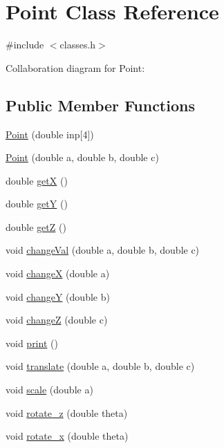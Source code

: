 \hypertarget{classPoint}{}\section{Point Class Reference}
\label{classPoint}


{\ttfamily \#include $<$classes.\+h$>$}



Collaboration diagram for Point\+:
\subsection*{Public Member Functions}
\begin{DoxyCompactItemize}
\item 
\hyperlink{classPoint_af2e3e1083751e14bc05209f4c4a1339a}{Point} (double inp\mbox{[}4\mbox{]})
\item 
\hyperlink{classPoint_adbf32d53d1eed06207a1bfdea4372415}{Point} (double a, double b, double c)
\item 
double \hyperlink{classPoint_a8de35a6098cdd7267b4167776da83da6}{getX} ()
\item 
double \hyperlink{classPoint_aa278c8bcb8aeb4101023a4baf473b547}{getY} ()
\item 
double \hyperlink{classPoint_a7c43742b167f182e08cc1b9aac9661e9}{getZ} ()
\item 
void \hyperlink{classPoint_a5d66dd08c4c5250b28e96bef02989023}{change\+Val} (double a, double b, double c)
\item 
void \hyperlink{classPoint_a2f2bf60675fa39288c64ceda699a1904}{changeX} (double a)
\item 
void \hyperlink{classPoint_ae09876e278f0dd55dd43b5b00ac7425c}{changeY} (double b)
\item 
void \hyperlink{classPoint_aa230fef488efa82249ecf44e84563c5d}{changeZ} (double c)
\item 
void \hyperlink{classPoint_a76c5855c06d98aed16b5796a9a50bbee}{print} ()
\item 
void \hyperlink{classPoint_afcdc5122dfa1f2840b3b524479d935cc}{translate} (double a, double b, double c)
\item 
void \hyperlink{classPoint_afafcd999caaf87a57be94847462a3a6f}{scale} (double a)
\item 
void \hyperlink{classPoint_a7d2a3f6fe7359761c108379ea4e79626}{rotate\+\_\+z} (double theta)
\item 
void \hyperlink{classPoint_af04a158a7fd9ae686d4c752e73db189c}{rotate\+\_\+x} (double theta)
\item 

\end{DoxyCompactItemize}

